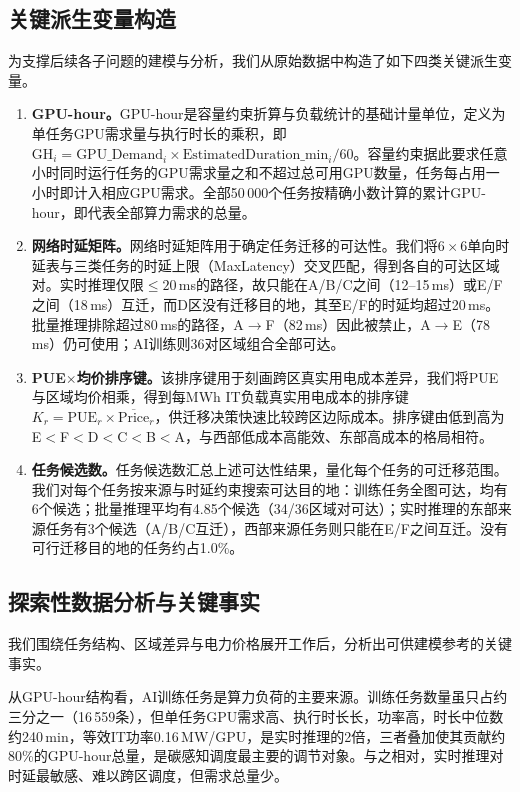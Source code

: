\subsection{关键派生变量构造}

为支撑后续各子问题的建模与分析，我们从原始数据中构造了如下四类关键派生变量。

\begin{enumerate}[label=\arabic*.]
    \item \textbf{GPU-hour。}GPU-hour是容量约束折算与负载统计的基础计量单位，定义为单任务GPU需求量与执行时长的乘积，即 $\text{GH}_i = \text{GPU\_Demand}_i \times \text{EstimatedDuration\_min}_i / 60$。容量约束据此要求任意小时同时运行任务的GPU需求量之和不超过总可用GPU数量，任务每占用一小时即计入相应GPU需求。全部50\,000个任务按精确小数计算的累计GPU-hour，即代表全部算力需求的总量。

    \item \textbf{网络时延矩阵。}网络时延矩阵用于确定任务迁移的可达性。我们将$6\times6$单向时延表与三类任务的时延上限（MaxLatency）交叉匹配，得到各自的可达区域对。实时推理仅限$\le20$\,ms的路径，故只能在A/B/C之间（12--15\,ms）或E/F之间（18\,ms）互迁，而D区没有迁移目的地，其至E/F的时延均超过20\,ms。批量推理排除超过80\,ms的路径，A$\to$F（82\,ms）因此被禁止，A$\to$E（78\,ms）仍可使用；AI训练则36对区域组合全部可达。

    \item \textbf{PUE$\times$均价排序键。}该排序键用于刻画跨区真实用电成本差异，我们将PUE与区域均价相乘，得到每MWh IT负载真实用电成本的排序键$K_r=\text{PUE}_r\times\overline{\text{Price}}_r$，供迁移决策快速比较跨区边际成本。排序键由低到高为E$<$F$<$D$<$C$<$B$<$A，与西部低成本高能效、东部高成本的格局相符。

    \item \textbf{任务候选数。}任务候选数汇总上述可达性结果，量化每个任务的可迁移范围。我们对每个任务按来源与时延约束搜索可达目的地：训练任务全图可达，均有6个候选；批量推理平均有4.85个候选（34/36区域对可达）；实时推理的东部来源任务有3个候选（A/B/C互迁），西部来源任务则只能在E/F之间互迁。没有可行迁移目的地的任务约占1.0\%。
\end{enumerate}

\subsection{探索性数据分析与关键事实}

我们围绕任务结构、区域差异与电力价格展开工作后，分析出可供建模参考的关键事实。

从GPU-hour结构看，AI训练任务是算力负荷的主要来源。训练任务数量虽只占约三分之一（16\,559条），但单任务GPU需求高、执行时长长，功率高，时长中位数约240\,min，等效IT功率0.16\,MW/GPU，是实时推理的2倍，三者叠加使其贡献约80\%的GPU-hour总量，是碳感知调度最主要的调节对象。与之相对，实时推理对时延最敏感、难以跨区调度，但需求总量少。

